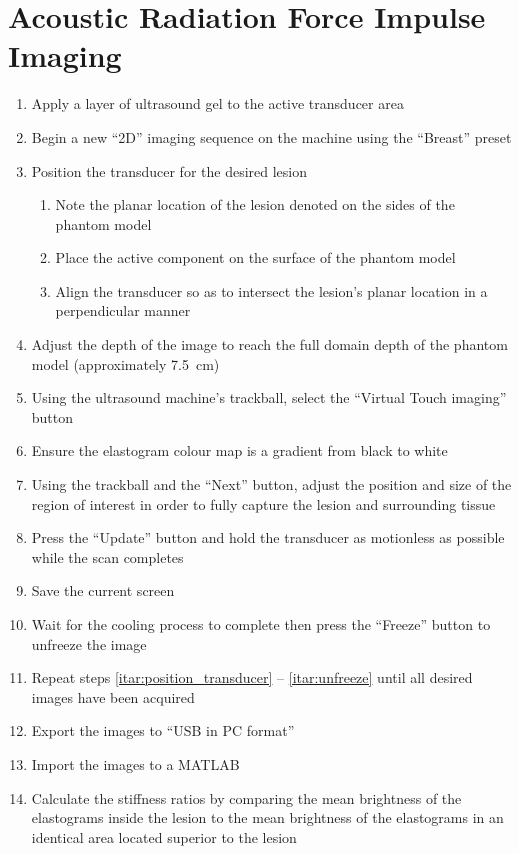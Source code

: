 	\section{Acoustic Radiation Force Impulse Imaging}
		\label{appsec:experimental_arfi}
		\begin{enumerate}
			\item Apply a layer of ultrasound gel to the active transducer area
			\item Begin a new ``2D'' imaging sequence on the machine using the ``Breast'' preset
			\item \label{itar:position_transducer} Position the transducer for the desired lesion
			\begin{enumerate}
				\item Note the planar location of the lesion denoted on the sides of the phantom model
				\item Place the active component on the surface of the phantom model
				\item Align the transducer so as to intersect the lesion's planar location in a perpendicular manner
			\end{enumerate}
			\item Adjust the depth of the image to reach the full domain depth of the phantom model (approximately \SI{7.5}{\cm})
			\item Using the ultrasound machine's trackball, select the ``Virtual Touch imaging'' button
			\item Ensure the elastogram colour map is a gradient from black to white
			\item Using the trackball and the ``Next'' button, adjust the position and size of the region of interest in order to fully capture the lesion and surrounding tissue
			\item Press the ``Update'' button and hold the transducer as motionless as possible while the scan completes
			\item Save the current screen
			\item \label{itar:unfreeze} Wait for the cooling process to complete then press the ``Freeze'' button to unfreeze the image
			\item Repeat steps \ref{itar:position_transducer} -- \ref{itar:unfreeze} until all desired images have been acquired
			\item Export the images to ``USB in PC format''
			\item Import the images to a MATLAB
			\item Calculate the stiffness ratios by comparing the mean brightness of the elastograms inside the lesion to the mean brightness of the elastograms in an identical area located superior to the lesion
		\end{enumerate}

